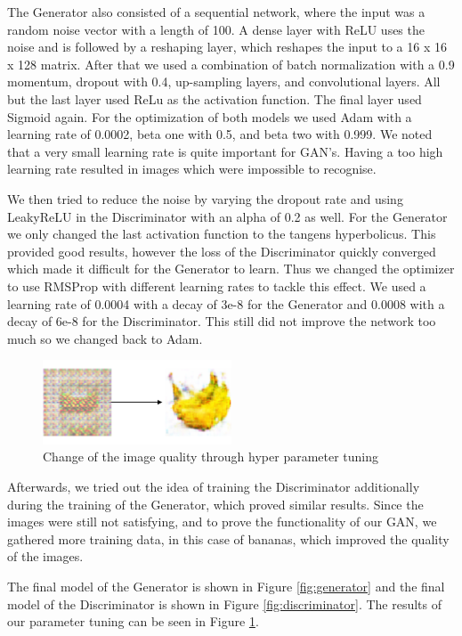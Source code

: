 \documentclass[13pt]{article}
\begin{document}
The Generator also consisted of a sequential network, where the input was a random noise vector with a length of 100.
A dense layer with ReLU uses the noise and is followed by a reshaping layer, which reshapes the input to a 16 x 16 x 128 matrix.
After that we used a combination of batch normalization with a 0.9 momentum, dropout with 0.4, up-sampling layers, and convolutional layers. All but the last layer used ReLu as the activation function. The final layer used Sigmoid again. For the optimization of both models we used Adam with a learning rate of 0.0002, beta one with 0.5, and beta two with 0.999. We noted that a very small learning rate is quite important for GAN's. Having a too high learning rate resulted in images which were impossible to recognise.

We then tried to reduce the noise by varying the dropout rate and using LeakyReLU in the Discriminator with an alpha of 0.2 as well. For the Generator we only changed the last activation function to the tangens hyperbolicus. This provided good results, however the loss of the Discriminator quickly converged which made it difficult for the Generator to learn. Thus we changed the optimizer to use RMSProp with different learning rates to tackle this effect. We used a learning rate of 0.0004 with a decay of 3e-8 for the Generator and 0.0008 with a decay of 6e-8 for the Discriminator. This still did not improve the network too much so we changed back to Adam.

\begin{figure}[h!]
\centering
\centerline{\includegraphics[width=0.5\textwidth]{plots/tuning.png}}
\caption{Change of the image quality through hyper parameter tuning}
\label{fig:tuning}
\end{figure}


Afterwards, we tried out the idea of training the Discriminator additionally during the training of the Generator, which proved similar results. Since the images were still not satisfying, and to prove the functionality of our GAN, we gathered more training data, in this case of bananas, which improved the quality of the images.

The final model of the Generator is shown in Figure \ref{fig:generator} and the final model of the Discriminator is shown in Figure \ref{fig:discriminator}. The results of our parameter tuning can be seen in Figure \ref{fig:tuning}.
\end{document}
